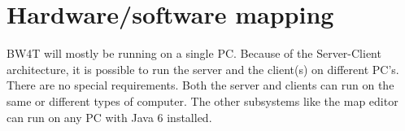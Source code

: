 \section{Hardware/software mapping}
BW4T will mostly be running on a single PC. Because of the Server-Client architecture, it is possible to run the server and the client(s) on different PC's. There are no special requirements. Both the server and clients can run on the same or different types of computer. The other subsystems like the map editor can run on any PC with Java 6 installed.  